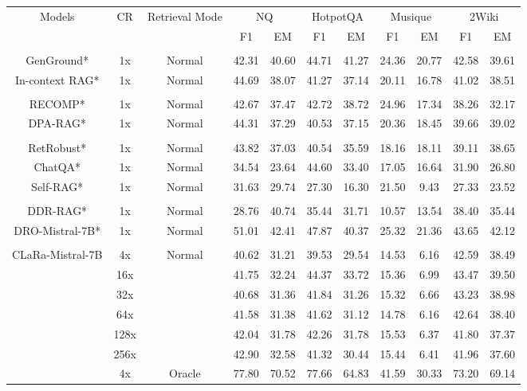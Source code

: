 \documentclass{applemlr}
\numberwithin{equation}{section}
\begin{document}
\begin{table}[!htbp]
\centering
\footnotesize
\begin{tabular}{c|c|c|cc|cc|cc|cc}
\hline

\multirow{2}{*}{Models} & \multirow{2}{*}{CR} & \multirow{2}{*}{Retrieval Mode}
& \multicolumn{2}{c|}{NQ}
& \multicolumn{2}{c|}{HotpotQA}
& \multicolumn{2}{c|}{Musique}
& \multicolumn{2}{c}{2Wiki}
\\
\cline{4-11}
& & & F1 & EM
  & F1 & EM
  & F1 & EM
  & F1 & EM
   \\
\hline
\rowcolor{gray!15}
\multicolumn{11}{c}{\textbf{Prompting-based Method}} \\
GenGround*  & 1x & Normal & 42.31 & 40.60 & 44.71 & 41.27 & 24.36 & 20.77 & 42.58 & 39.61   \\
In-context RAG*  & 1x & Normal & 44.69 & 38.07 & 41.27 & 37.14 & 20.11 & 16.78 & 41.02 & 38.51 \\
\hline
\rowcolor{gray!15}
\multicolumn{11}{c}{\textbf{Retrieval tuning}} \\
RECOMP* & 1x & Normal & 42.67 & 37.47 & 42.72 & 38.72 & 24.96 & 17.34 & 38.26 & 32.17 \\
DPA-RAG* &1x &Normal & 44.31&37.29&40.53&37.15&20.36&18.45&39.66&39.02 \\
\hline
\rowcolor{gray!15}
\multicolumn{11}{c}{\textbf{LLM Fine-tuning}} \\
RetRobust* & 1x& Normal & 43.82 & 37.03 & 40.54 & 35.59 & 18.16 & 18.11 & 39.11 & 38.65 \\
ChatQA*  & 1x & Normal & 34.54 & 23.64 & 44.60 & 33.40 & 17.05 & 16.64 & 31.90 & 26.80   \\
Self-RAG* & 1x & Normal & 31.63 & 29.74 & 27.30 & 16.30 & 21.50 & 9.43 & 27.33 & 23.52   \\
\hline
\rowcolor{gray!15}
\multicolumn{11}{c}{\textbf{End-to-end optimization}} \\
DDR-RAG*  & 1x & Normal & 28.76 & 40.74 & 35.44 & 31.71 & 10.57&13.54 & 38.40 &35.44   \\
DRO-Mistral-7B*  & 1x & Normal & 51.01 & 42.41 & 47.87 & 40.37 & 25.32 & 21.36 & 43.65 & 42.12   \\
\hline
\rowcolor{gray!15}
\multicolumn{11}{c}{\textbf{Pretraining-initialized}} \\

\multirow{12}{*}{CLaRa-Mistral-7B} & 4x & \multirow{6}{*}{Normal}  & 40.62 & 31.21 & 39.53 & 29.54 & 14.53 & 6.16 & 42.59 & 38.49\\
 & 16x & & 41.75 & 32.24 & 44.37 & 33.72 & 15.36 & 6.99 & 43.47 & 39.50 \\
& 32x &  & 40.68 & 31.36 & 41.84 & 31.26 & 15.32 & 6.66 & 43.23 & 38.98  \\
& 64x &  & 41.58 & 31.38 & 41.62 & 31.12 & 14.78 & 6.16 & 42.64 & 38.40 \\
& 128x & & 42.04 & 31.78 & 42.26 & 31.78 & 15.53 & 6.37 & 41.80 & 37.37 \\
 & 256x &  & 42.90 & 32.58 & 41.32 & 30.44 & 15.44 & 6.41 & 41.96 & 37.60  \\
 \cline{2-11}
 &  4x& \multirow{6}{*}{Oracle} & 77.80 & 70.52 & 77.66 & 64.83 & 41.59 & 30.33 & 73.20 & 69.14  \\


\end{tabular}
\end{table}
\end{document}
